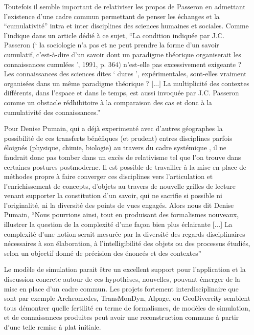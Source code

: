 Toutefois il semble important de relativiser les propos de Passeron en admettant l'existence d'une cadre commun permettant de penser les échanges et la \enquote{cumulativité}  intra et inter disciplines des sciences humaines et sociales. Comme l'indique \textcite{Pumain2005} dans un article dédié à ce sujet, \enquote{La condition indiquée par J.C. Passeron (\enquote{ la sociologie n’a pas et ne peut prendre la forme d’un savoir cumulatif, c’est-à-dire d’un savoir dont un paradigme théorique organiserait les connaissances cumulées }, 1991, p. 364) n’est-elle pas excessivement exigeante ? Les connaissances des sciences dites \enquote{ dures }, expérimentales, sont-elles vraiment organisées dans un même paradigme théorique ? [...] La multiplicité des contextes différents, dans l’espace et dans le temps, est aussi invoquée par J.C. Passeron comme un obstacle rédhibitoire à la comparaison des cas et donc à la cumulativité des connaissances.} 

Pour Denise Pumain, qui a déjà experimenté avec d'autres géographes la possibilité de ces transferts bénéfiques (et prudent) entres disciplines parfois éloignés (physique, chimie, biologie) au travers du cadre systémique \autocites{Pumain1989,Sanders1992, Dastes1998}, il ne faudrait donc pas tomber dans un excès de relativisme tel que l'on trouve dans certaines postures postmoderne. Il est possible de travailler à la mise en place de méthodes  propre à faire converger ces disciplines vers l'articulation et l'enrichissement de concepts, d'objets au travers de nouvelle grilles de lecture venant supporter la constitution d'un savoir, qui ne sacrifie si possible ni l'originalité, ni la diversité des points de vues engagés. Alors nous dit Denise Pumain, \enquote{Nous pourrions ainsi, tout en produisant des formalismes nouveaux, illustrer la question de la complexité d’une façon bien plus éclairante [...] La complexité d’une notion serait mesurée par la diversité des regards disciplinaires nécessaires à son élaboration, à l’intelligibilité des objets ou des processus étudiés, selon un objectif donné de précision des énoncés et des contextes}

Le modèle de simulation parait être un excellent support pour l'application et la discussion concrete autour de ces hypothèses, nouvelles, pouvant émerger de la mise en place d'un cadre commun. Les projets fortement interdisciplinaire que sont par exemple Archeomedes, TransMonDyn, Alpage, ou GeoDivercity \autocite{Chapron2014} semblent tous démontrer quelle fertilité en terme de formalismes, de modèles de simulation, et de connaissances produites peut avoir une reconstruction commune à partir d'une telle remise à plat initiale. 

